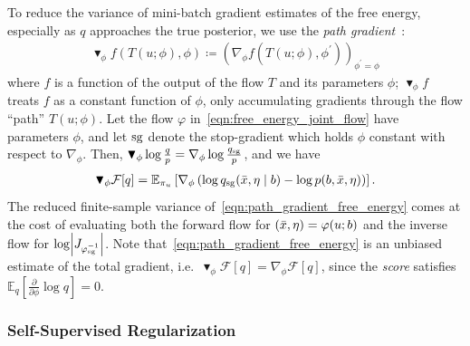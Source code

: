 To reduce the variance of mini-batch gradient estimates of the free energy, especially as $q$ approaches the true posterior, we use the \textit{path gradient}~\citep{roeder_sticking_2017,agrawal_advances_2020,vaitl_fast_2024}:
\begin{align}\label{eqn:path_gradient}
    \blacktriangledown_{\phi} f(T(u; \phi), \phi) \coloneqq \left( \nabla_{\phi} f(T(u; \phi), \phi^\prime) \right)_{\phi^\prime = \phi}
\end{align}
where $f$ is a function of the output of the flow $T$ and its parameters $\phi$;
$\blacktriangledown_{\phi} f$ treats $f$ as a constant function of $\phi$, only accumulating gradients through the flow ``path'' $T(u; \phi)$.
Let the flow $\varphi$ in~\eqref{eqn:free_energy_joint_flow} have parameters $\phi$, and let $\operatorname{sg}$ denote the stop-gradient which holds $\phi$ constant with respect to $\nabla_{\phi}$.
Then, $\blacktriangledown_{\phi} \log \frac{q}{p} = \nabla_\phi \log \frac{q_{\operatorname{sg}}}{p}$, and we have
\begin{align}\label{eqn:path_gradient_free_energy}
    \blacktriangledown_{\phi} \mathcal{F}[q] = \mathbb{E}_{\pi_{u}} \left[\nabla_{\phi} \left( \log q_{\operatorname{sg}}(\bar{x}, \eta \mid b) - \log p(b, \bar{x}, \eta) \right) \right].
\end{align}
The reduced finite-sample variance of~\eqref{eqn:path_gradient_free_energy} comes at the cost of evaluating both the forward flow for $(\bar{x}, \eta) = \varphi(u; b)$ and the inverse flow for $\log\AbsDet{\vv{J}_{\varphi^{-1}_{\StopGradient}}}$.
Note that~\eqref{eqn:path_gradient_free_energy} is an unbiased estimate of the total gradient, i.e.\ $\blacktriangledown_{\phi}\mathcal{F}[q] = \nabla_{\phi}\mathcal{F}[q]$, since the \textit{score} satisfies $\mathbb{E}_{q}[\frac{\partial}{\partial\phi} \log q] = 0$.

\subsubsection{Self-Supervised Regularization}

